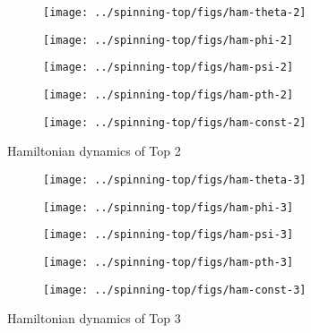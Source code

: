 \begin{figure}[H]
  \centering
  \begin{subfigure}{0.49\textwidth}
    \texttt{[image: ../spinning-top/figs/ham-theta-2]}
    \caption{}
  \end{subfigure}
  \begin{subfigure}{0.49\textwidth}
    \texttt{[image: ../spinning-top/figs/ham-phi-2]}
    \caption{}
  \end{subfigure}
  \begin{subfigure}{0.49\textwidth}
    \texttt{[image: ../spinning-top/figs/ham-psi-2]}
    \caption{}
    \end{subfigure}
  \begin{subfigure}{0.49\textwidth}
    \texttt{[image: ../spinning-top/figs/ham-pth-2]}
    \caption{}
    \end{subfigure}
  \begin{subfigure}{0.49\textwidth}
    \texttt{[image: ../spinning-top/figs/ham-const-2]}
    \caption{}
    \label{fig:hamE2}
  \end{subfigure}
  \caption{Hamiltonian dynamics of Top 2}
  \label{fig:ham-motion-Top2}
\end{figure}

\begin{figure}[H]
  \centering
  \begin{subfigure}{0.49\textwidth}
    \texttt{[image: ../spinning-top/figs/ham-theta-3]}
    \caption{}
  \end{subfigure}
  \begin{subfigure}{0.49\textwidth}
    \texttt{[image: ../spinning-top/figs/ham-phi-3]}
    \caption{}
  \end{subfigure}
  \begin{subfigure}{0.49\textwidth}
    \texttt{[image: ../spinning-top/figs/ham-psi-3]}
    \caption{}
    \end{subfigure}
  \begin{subfigure}{0.49\textwidth}
    \texttt{[image: ../spinning-top/figs/ham-pth-3]}
    \caption{}
    \end{subfigure}
  \begin{subfigure}{0.49\textwidth}
    \texttt{[image: ../spinning-top/figs/ham-const-3]}
    \caption{}
    \label{fig:hamE3}
  \end{subfigure}
  \caption{Hamiltonian dynamics of Top 3}
  \label{fig:ham-motion-Top3}
\end{figure}

